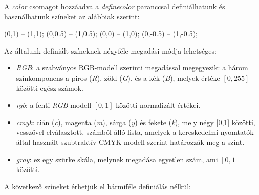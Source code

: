 A \textit{color} csomagot hozzáadva a \textit{definecolor} paranccsal definiálhatunk és használhatunk színeket az alábbiak szerint:
\begin{tikzcode}

\draw [myRGB] (0,1) -- (1,1);
\draw [myrgb] (0,0.5) -- (1,0.5);
\draw [mycmyk] (0,0) -- (1,0);
\draw [mygray] (0,-0.5) -- (1,-0.5);
\end{tikzcode}

Az általunk definiált színeknek négyféle megadási módja lehetséges:

\begin{itemize}
	\item[] \textit{RGB}: a szabványos RGB-modell szerinti megadással megegyezik: a három színkomponens a piros (\textit{R}), zöld (\textit{G}), és a kék (\textit{B}), melyek értéke $[0,255]$ közötti egész számok.
	\item[] \textit{rgb}: a fenti \textit{RGB}-modell $[0,1]$ közötti normalizált értékei. 
	\item[]  \textit{cmyk}: cián (\textit{c}), magenta (\textit{m}), sárga (\textit{y}) és fekete (\textit{k}), mely négy [0,1] közötti, vesszővel elválasztott, számból álló lista, amelyek a kereskedelmi nyomtatók által használt szubtraktív CMYK-modell szerint határozzák meg a színt.
	\item[] \textit{gray}: ez egy szürke skála, melynek megadása egyetlen szám, ami $[0,1]$ közötti.
\end{itemize}

A következő színeket érhetjük el bármiféle definiálás nélkül: 

